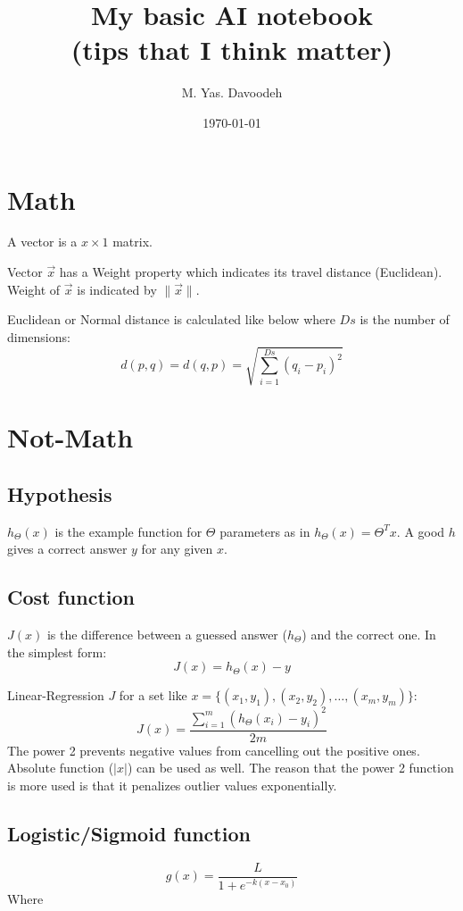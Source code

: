 \documentclass[a5paper]{article}
\author{M. Yas. Davoodeh}
\title{My basic AI notebook \\(tips that I think matter)}
\date{\today}
\begin{document}
\maketitle

\section{Math}
A vector is a $x\times1$ matrix.

Vector $\vec{x}$ has a Weight property which indicates its travel distance (Euclidean).
Weight of $\vec{x}$ is indicated by $\|\vec{x}\|$.

Euclidean or Normal distance is calculated like below where $Ds$ is the number of dimensions:
\begin{equation}
  d(p, q) = d(q, p) = \sqrt{\sum_{i=1}^{Ds}(q_{i}-p_{i})^{2}}
\end{equation}

\section{Not-Math}
\subsection{Hypothesis}
$h_{\Theta}(x)$ is the example function for $\Theta$ parameters as in $h_{\Theta}(x) = \Theta^{T}x$.
A good $h$ gives a correct answer $y$ for any given $x$.

\subsection{Cost function}
$J(x)$ is the difference between a guessed answer ($h_{\Theta}$) and the correct one.
In the simplest form:
\begin{equation}
  J(x) = h_{\Theta}(x) - y
\end{equation}

Linear-Regression $J$ for a set like $x= \{(x_{1}, y_{1}), (x_{2}, y_{2}), \dots, (x_{m}, y_{m})\}$:
\begin{equation}
  J(x) = \frac{\sum_{i=1}^{m}(h_{\Theta}(x_{i}) - y_{i})^{2}}{2m}
\end{equation}
The power 2 prevents negative values from cancelling out the positive ones.
Absolute function ($|x|$) can be used as well. The reason that the power 2 function is more used is that it penalizes outlier values exponentially.

\subsection{Logistic/Sigmoid function}
\begin{equation}
  g(x) = \frac{L}{1+e^{-k(x-x_{0})}}
\end{equation}
\setlength{\leftskip}{1cm}
Where
\end{document}
